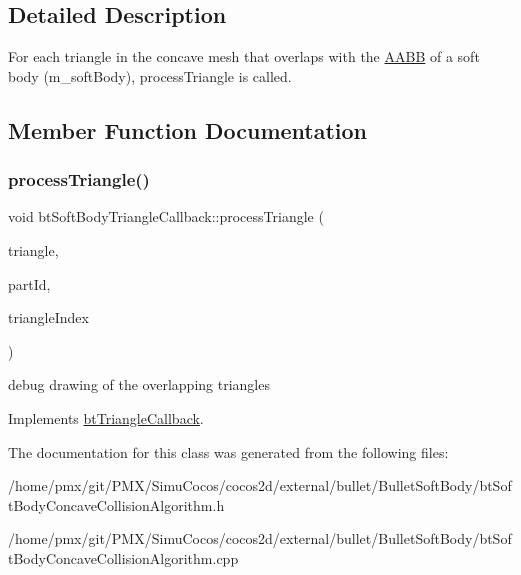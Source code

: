 \subsection{Detailed Description}
For each triangle in the concave mesh that overlaps with the \hyperlink{classAABB}{A\+A\+BB} of a soft body (m\+\_\+soft\+Body), process\+Triangle is called. 

\subsection{Member Function Documentation}
\mbox{\label{classbtSoftBodyTriangleCallback_a0f8b46eba213eb55a451e182d2f6a9be}} 
\subsubsection{\texorpdfstring{process\+Triangle()}{processTriangle()}}
{\footnotesize\ttfamily void bt\+Soft\+Body\+Triangle\+Callback\+::process\+Triangle (\begin{DoxyParamCaption}\item[{bt\+Vector3 $\ast$}]{triangle,  }\item[{int}]{part\+Id,  }\item[{int}]{triangle\+Index }\end{DoxyParamCaption})\hspace{0.3cm}{\ttfamily [virtual]}}

debug drawing of the overlapping triangles 

Implements \hyperlink{classbtTriangleCallback}{bt\+Triangle\+Callback}.



The documentation for this class was generated from the following files\+:\begin{DoxyCompactItemize}
\item 
/home/pmx/git/\+P\+M\+X/\+Simu\+Cocos/cocos2d/external/bullet/\+Bullet\+Soft\+Body/bt\+Soft\+Body\+Concave\+Collision\+Algorithm.\+h\item 
/home/pmx/git/\+P\+M\+X/\+Simu\+Cocos/cocos2d/external/bullet/\+Bullet\+Soft\+Body/bt\+Soft\+Body\+Concave\+Collision\+Algorithm.\+cpp\end{DoxyCompactItemize}
